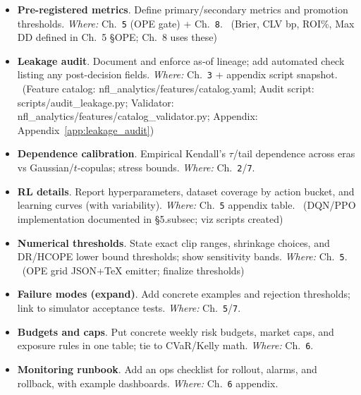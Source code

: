 \begin{itemize}
  \item {} \textbf{Pre-registered metrics}. Define primary/secondary metrics and promotion thresholds. \emph{Where:} Ch.~\texttt{5} (OPE gate) + Ch.~\texttt{8}. \done\ (Brier, CLV bp, ROI\%, Max DD defined in Ch.~5 \S OPE; Ch.~8 uses these)
  \item {} \textbf{Leakage audit}. Document and enforce as-of lineage; add automated check listing any post-decision fields. \emph{Where:} Ch.~\texttt{3} + appendix script snapshot. \done\ (Feature catalog: nfl\_analytics/features/catalog.yaml; Audit script: scripts/audit\_leakage.py; Validator: nfl\_analytics/features/catalog\_validator.py; Appendix: Appendix~\ref{app:leakage_audit})
\end{itemize}

\begin{itemize}
  \item {} \textbf{Dependence calibration}. Empirical Kendall’s $\tau$/tail dependence across eras vs Gaussian/$t$-copulas; stress bounds. \emph{Where:} Ch.~\texttt{2}/\texttt{7}.
  \item {} \textbf{RL details}. Report hyperparameters, dataset coverage by action bucket, and learning curves (with variability). \emph{Where:} Ch.~\texttt{5} appendix table. \done\ (DQN/PPO implementation documented in \S5.subsec; viz scripts created)
\end{itemize}

\begin{itemize}
  \item {} \textbf{Numerical thresholds}. State exact clip ranges, shrinkage choices, and DR/HCOPE lower bound thresholds; show sensitivity bands. \emph{Where:} Ch.~\texttt{5}. \done\ (OPE grid JSON+TeX emitter; finalize thresholds)
  \item {} \textbf{Failure modes (expand)}. Add concrete examples and rejection thresholds; link to simulator acceptance tests. \emph{Where:} Ch.~\texttt{5}/\texttt{7}.
\end{itemize}

\begin{itemize}
  \item {} \textbf{Budgets and caps}. Put concrete weekly risk budgets, market caps, and exposure rules in one table; tie to CVaR/Kelly math. \emph{Where:} Ch.~\texttt{6}.
  \item {} \textbf{Monitoring runbook}. Add an ops checklist for rollout, alarms, and rollback, with example dashboards. \emph{Where:} Ch.~\texttt{6} appendix.
\end{itemize}

